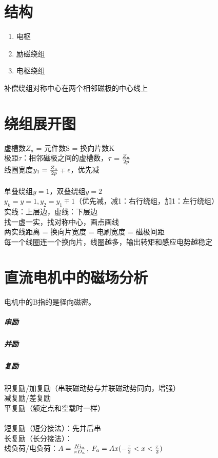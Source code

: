 \documentclass{book}
\begin{document}
    \section{结构}
    \begin{enumerate}
        \item 电枢
        \item 励磁绕组
        \item 电枢绕组
    \end{enumerate}
    补偿绕组对称中心在两个相邻磁极的中心线上


    \section{绕组展开图}
    虚槽数$Z_{u}$ = 元件数S = 换向片数K\\
    极距$\tau$：相邻磁极之间的虚槽数，$\tau = {Z_{u} \over {2 p}}$\\
    线圈宽度$y_{1}={Z_{u} \over {2 p}} \mp \epsilon$，优先减\\\\
    单叠绕组$y=1$，双叠绕组$y=2$\\
    $y_{k}=y=1, y_{2}=y_{1} \mp 1$（优先减，减1：右行绕组，加1：左行绕组）\\

    实线：上层边，虚线：下层边\\
    找一虚一实，找对称中心，画点画线\\
    两实线距离 = 换向片宽度 = 电刷宽度 = 磁极间距\\

    每一个线圈连一个换向片，线圈越多，输出转矩和感应电势越稳定\\


    \section{直流电机中的磁场分析}
    电机中的B指的是径向磁密。\\
    \subparagraph*{串励}
    \subparagraph*{并励}
    \subparagraph*{复励}
    积复励/加复励（串联磁动势与并联磁动势同向，增强）\\
    减复励/差复励\\
    平复励（额定点和空载时一样）\\\\
    短复励（短分接法）：先并后串\\
    长复励（长分接法）：\\

    线负荷/电负荷：$A={{N i_{a}} \over {\pi D_{a}}}$,
    $F_{a} = A x (-{\tau \over 2} < x < {\tau \over 2})$\\
\end{document}
